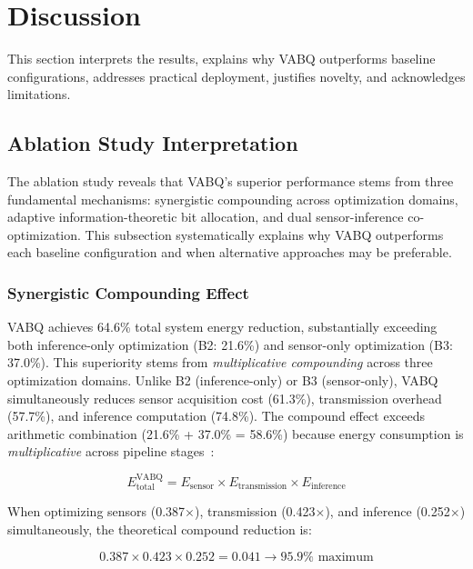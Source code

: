 \section{Discussion}
\label{sec:discussion}

This section interprets the results, explains why VABQ outperforms baseline configurations, addresses practical deployment, justifies novelty, and acknowledges limitations.

\subsection{Ablation Study Interpretation}
\label{sec:disc_ablation}

The ablation study reveals that VABQ's superior performance stems from three fundamental mechanisms: synergistic compounding across optimization domains, adaptive information-theoretic bit allocation, and dual sensor-inference co-optimization. This subsection systematically explains why VABQ outperforms each baseline configuration and when alternative approaches may be preferable.

\subsubsection{Synergistic Compounding Effect}

VABQ achieves 64.6\% total system energy reduction, substantially exceeding both inference-only optimization (B2: 21.6\%) and sensor-only optimization (B3: 37.0\%). This superiority stems from \textit{multiplicative compounding} across three optimization domains. Unlike B2 (inference-only) or B3 (sensor-only), VABQ simultaneously reduces sensor acquisition cost (61.3\%), transmission overhead (57.7\%), and inference computation (74.8\%). The compound effect exceeds arithmetic combination (21.6\% + 37.0\% = 58.6\%) because energy consumption is \textit{multiplicative} across pipeline stages~\cite{energycompounding2024}:

\begin{equation}
E_{\text{total}}^{\text{VABQ}} = E_{\text{sensor}} \times E_{\text{transmission}} \times E_{\text{inference}}
\end{equation}

When optimizing sensors (0.387$\times$), transmission (0.423$\times$), and inference (0.252$\times$) simultaneously, the theoretical compound reduction is:

\begin{equation}
0.387 \times 0.423 \times 0.252 = 0.041 \rightarrow 95.9\% \text{ maximum}
\end{equation}

